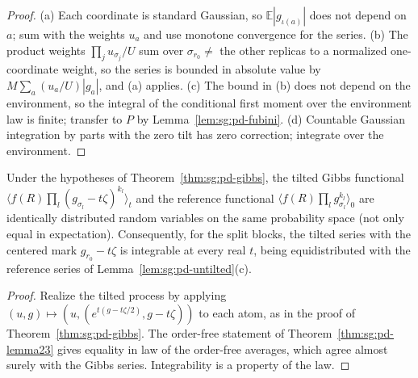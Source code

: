 \begin{proof}
  \leanok
(a) Each coordinate is standard Gaussian, so $\mathbb E|g_{\iota(a)}|$ does not depend on $a$; sum with the weights $u_a$ and use monotone convergence for the series. (b) The product weights $\prod_j u_{\sigma_j}/U$ sum over $\sigma_{r_0}\ne$ the other replicas to a normalized one-coordinate weight, so the series is bounded in absolute value by $M\sum_a(u_a/U)|g_a|$, and (a) applies. (c) The bound in (b) does not depend on the environment, so the integral of the conditional first moment over the environment law is finite; transfer to $P$ by Lemma~\ref{lem:sg:pd-fubini}. (d) Countable Gaussian integration by parts with the zero tilt has zero correction; integrate over the environment.
\end{proof}

\begin{lemma}\label{lem:sg:pd-tilt-law}
  \leanok
  Under the hypotheses of Theorem~\ref{thm:sg:pd-gibbs}, the tilted Gibbs functional $\langle f(R)\prod_l(g_{\sigma_l}-t\zeta)^{k_l}\rangle_t$ and the reference functional $\langle f(R)\prod_lg_{\sigma_l}^{k_l}\rangle_0$ are identically distributed random variables on the same probability space (not only equal in expectation). Consequently, for the split blocks, the tilted series with the centered mark $g_{r_0}-t\zeta$ is integrable at every real $t$, being equidistributed with the reference series of Lemma~\ref{lem:sg:pd-untilted}(c).
\end{lemma}

\begin{proof}
  \leanok
Realize the tilted process by applying $(u,g)\mapsto(u,(e^{t(g-t\zeta/2)},g-t\zeta))$ to each atom, as in the proof of Theorem~\ref{thm:sg:pd-gibbs}. The order-free statement of Theorem~\ref{thm:sg:pd-lemma23} gives equality in law of the order-free averages, which agree almost surely with the Gibbs series. Integrability is a property of the law.
\end{proof}

